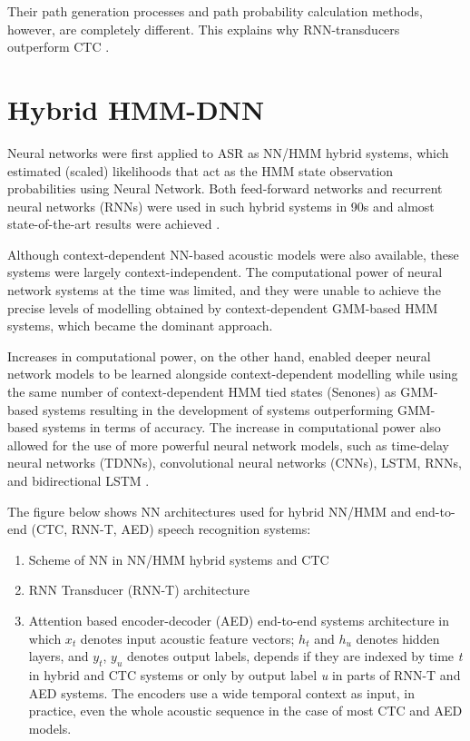 Their path generation processes and path probability calculation methods, however, are completely different. This explains why RNN-transducers outperform CTC \cite{backstrom_introduction_2022}.

\section{Hybrid HMM-DNN} 
\label{sec:hybrid HMM-DNN}

Neural networks were first applied to ASR as NN/HMM hybrid systems, which estimated (scaled) likelihoods that act as the HMM state observation probabilities using Neural Network. Both feed-forward networks and recurrent neural networks (RNNs) were used in such hybrid systems in 90s and almost state-of-the-art results were achieved \cite{morgan_continuous_1995}. 

Although context-dependent NN-based acoustic models were also available, these systems were largely context-independent. The computational power of neural network systems at the time was limited, and they were unable to achieve the precise levels of modelling obtained by context-dependent GMM-based HMM systems, which became the dominant approach.

Increases in computational power, on the other hand, enabled deeper neural network models to be learned alongside context-dependent modelling while using the same number of context-dependent HMM tied states (Senones) as GMM-based systems resulting in the development of systems outperforming GMM-based systems in terms of accuracy. The increase in computational power also allowed for the use of more powerful neural network models, such as time-delay neural networks (TDNNs), convolutional neural networks (CNNs), LSTM, RNNs, and bidirectional LSTM \cite{bell_adaptation_2021}.

The figure below shows NN architectures used for hybrid NN/HMM and end-to-end (CTC, RNN-T, AED) speech recognition systems:
\begin{enumerate}[label=(\alph*)]
    \item Scheme of NN in NN/HMM hybrid systems and CTC
    \item RNN Transducer (RNN-T) architecture
    \item Attention based encoder-decoder (AED) end-to-end systems architecture in which $x_{t}$ denotes input acoustic feature vectors; $h_{t}$ and $h_{u}$ denotes hidden layers, and $y_{t}$, $y_{u}$ denotes output labels, depends if they are indexed by time \textit{t} in hybrid and CTC systems or only by output label \textit{u} in parts of RNN-T and AED systems. The encoders use a wide temporal context as input, in practice, even the whole acoustic sequence in the case of most CTC and AED models.
\end{enumerate}

